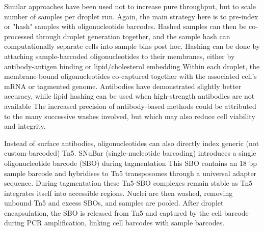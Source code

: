 Similar approaches have been used not to increase pure throughput, but to scale number of samples per droplet run. Again, the main strategy here is to pre-index or "hash" samples with oligonucleotide barcodes. Hashed samples can then be co-processed through droplet generation together, and the sample hash can computationally separate cells into sample bins post hoc. Hashing can be done by attaching sample-barcoded oligonucleotides to their membranes, either by antibody-antigen binding or lipid/cholesterol embedding Within each droplet, the membrane-bound oligonucleotides co-captured together with the associated cell's mRNA or tagmented genome. Antibodies have demonstrated slightly better accuracy, while lipid hashing can be used when high-strength antibodies are not available The increased precision of antibody-based methods could be attributed to the many successive washes involved, but which may also reduce cell viability and integrity.

Instead of surface antibodies, oligonucleotides can also directly index generic (not custom-barcoded) Tn5. SNuBar (single-nucleotide barcoding) introduces a single oligonucleotide barcode (SBO) during tagmentation This SBO contains an 18 bp sample barcode and hybridises to Tn5 transposomes through a universal adapter sequence. During tagmentation these Tn5-SBO complexes remain stable as Tn5 integrates itself into accessible regions. Nuclei are then washed, removing unbound Tn5 and excess SBOs, and samples are pooled. After droplet encapsulation, the SBO is released from Tn5 and captured by the cell barcode during PCR amplification, linking cell barcodes with sample barcodes.




